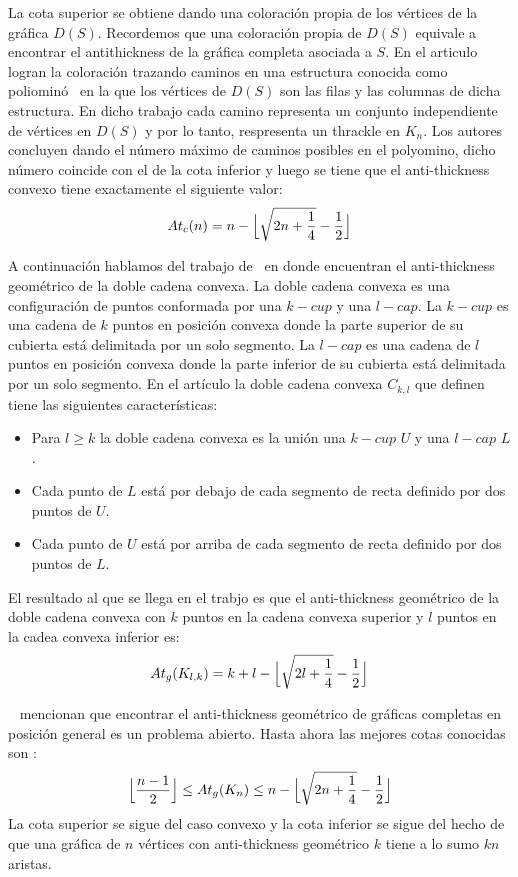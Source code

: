 La cota superior se obtiene dando una coloración propia de los vértices de la gráfica
$D(S)$. Recordemos que una coloración propia de $D(S)$ equivale a encontrar el
antithickness de la gráfica completa asociada a $S$.
En el articulo logran la coloración trazando caminos en una
estructura conocida como poliominó~\cite{Fabila-Monroy2018-poly}
en la que los vértices de $D(S)$ son las filas y las columnas de dicha estructura.
En dicho trabajo cada camino representa un conjunto independiente de vértices en
 $D(S)$ y por lo tanto, respresenta un thrackle en $K_n$.
Los autores concluyen dando el número máximo de caminos posibles en el
polyomino, dicho número coincide con el de la cota inferior y luego se tiene
que el anti-thickness convexo tiene exactamente el siguiente valor:
\[ At_c(n) = n - \Bigl\lfloor \sqrt{2n + \frac{1}{4}} - \frac{1}{2} \Bigr\rfloor \]

A continuación hablamos del trabajo de~\cite{Lomeli2018} en donde encuentran el
anti-thickness geométrico de la doble cadena convexa. La doble cadena convexa
es una configuración de puntos conformada por una $k-cup$ y una $l-cap$. La $k-cup$
es una cadena de $k$ puntos en posición convexa donde la parte superior de su
cubierta está delimitada por un solo segmento. La $l-cap$ es una cadena
de $l$ puntos en posición convexa donde la parte inferior de su cubierta está delimitada
por un solo segmento. En el artículo la doble cadena convexa $C_{k,l}$ que definen tiene
las siguientes características:
\begin{itemize}
  \item Para $l\geq k$ la doble cadena convexa es la unión una $k-cup$ $U$ y una $l-cap$ $L$.
  \item Cada punto de $L$ está por debajo de cada segmento de recta definido por dos puntos de $U$.
  \item Cada punto de $U$ está por arriba de cada segmento de recta definido por dos puntos de $L$.
\end{itemize}

El resultado al que se llega en el trabjo es que
el anti-thickness geométrico de la doble cadena convexa con $k$ puntos en la cadena convexa superior
y $l$ puntos en la cadea convexa inferior es:
 \[At_g(K_{l,k}) = k+l-\Bigl\lfloor \sqrt{2l+\frac{1}{4}} - \frac{1}{2} \Bigr\rfloor\]

 ~\cite{Dujmovic2017} mencionan que encontrar el anti-thickness geométrico de gráficas
 completas en posición general es un problema abierto. Hasta ahora las mejores cotas conocidas
 son :
 \[\Bigl\lfloor\frac{n-1}{2}\Bigr\rfloor \leq At_g(K_n) \leq n - \Bigl\lfloor \sqrt{2n + \frac{1}{4}} - \frac{1}{2} \Bigr\rfloor \]
 La cota superior se sigue del caso convexo y la cota inferior
 se sigue del hecho de que una gráfica de $n$ vértices
con anti-thickness geométrico $k$ tiene a lo sumo $kn$ aristas.

